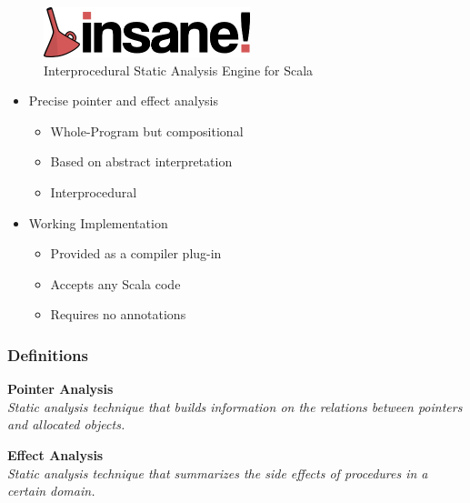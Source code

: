 \documentclass[hyperref={pdfpagelabels=false}]{beamer}
\begin{document}
\begin{frame}[label=overview]
    \begin{figure}[t]
        \includegraphics[width=60mm]{../../../logo.png}\\
        Interprocedural Static Analysis Engine for Scala
    \end{figure}

    \begin{itemize}
        \item Precise pointer and effect analysis
            \begin{itemize}
                \item Whole-Program but compositional
                \item Based on abstract interpretation
                \item Interprocedural
            \end{itemize}
        \item Working Implementation
            \begin{itemize}
                \item Provided as a compiler plug-in
                \item Accepts any Scala code
                \item Requires no annotations
            \end{itemize}
    \end{itemize}
\end{frame}

\begin{frame}
\frametitle{Definitions}
    \textbf{Pointer Analysis}\\
    \emph{Static analysis technique that builds information on the
relations between pointers and allocated objects.}

    \vspace{30pt}

    \textbf{Effect Analysis}\\
    \emph{Static analysis technique that summarizes the side effects
of procedures in a certain domain.}
\end{frame}
\end{document}
